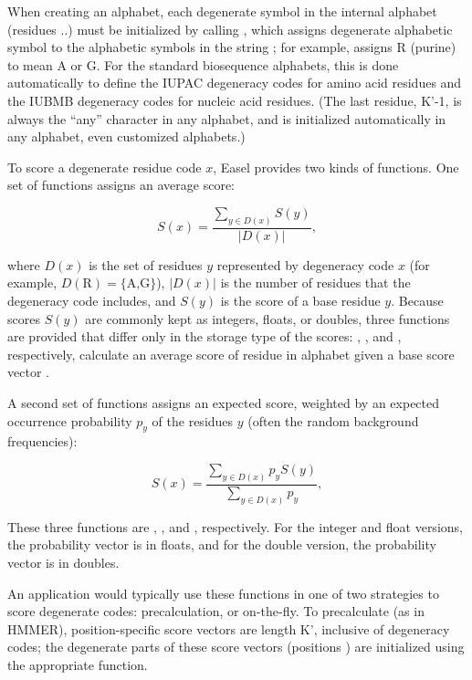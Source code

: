 When creating an alphabet, each degenerate symbol in the internal
alphabet (residues ..) must be initialized by
calling , which
assigns degenerate alphabetic symbol  to the alphabetic
symbols in the string ; for example,
 assigns R
(purine) to mean A or G.  For the standard biosequence alphabets, this
is done automatically to define the IUPAC degeneracy codes for amino
acid residues and the IUBMB degeneracy codes for nucleic acid
residues.  (The last residue, K'-1, is always the ``any'' character in
any alphabet, and is initialized automatically in any alphabet, even
customized alphabets.)

To score a degenerate residue code $x$, Easel provides two kinds of
functions. One set of functions assigns an average score:

\[
  S(x) =  \frac{\sum_{y \in D(x)}  S(y) } { |D(x)| },
\]

where $D(x)$ is the set of residues $y$ represented by degeneracy code
$x$ (for example, $D(\mbox{R}) = \{ \mbox{A,G} \}$), $| D(x) |$ is the
number of residues that the degeneracy code includes, and $S(y)$ is
the score of a base residue $y$. Because scores $S(y)$ are commonly
kept as integers, floats, or doubles, three functions are provided
that differ only in the storage type of the scores:
, , and
, respectively, calculate an average
score of residue  in alphabet  given a base score
vector .

A second set of functions assigns an expected score, weighted by an
expected occurrence probability $p_y$ of the residues $y$ (often the
random background frequencies):

\[
  S(x) =  \frac{\sum_{y \in D(x)}  p_y S(y) } { \sum_{y \in D(x)} p_y },
\]

These three functions are ,
, and
, respectively. For the integer
and float versions, the probability vector is in floats, and for the
double version, the probability vector is in doubles.

An application would typically use these functions in one of two
strategies to score degenerate codes: precalculation, or on-the-fly.
To precalculate (as in HMMER), position-specific score vectors are
length K', inclusive of degeneracy codes; the degenerate parts of
these score vectors (positions ) are initialized
using the appropriate function. 

